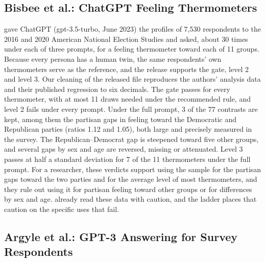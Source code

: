 \subsection{Bisbee et al.: ChatGPT Feeling Thermometers}

\citet{bisbee2024synthetic} gave ChatGPT (gpt-3.5-turbo, June 2023) the profiles of 7,530 respondents to the 2016 and 2020 American National Election Studies and asked, about 30 times under each of three prompts, for a feeling thermometer toward each of 11 groups. %
Because every persona has a human twin, the same respondents' own thermometers serve as the reference, and the release supports the gate, level 2 and level 3.
Our cleaning of the released file reproduces the authors' analysis data and their published regression to six decimals. %
The gate passes for every thermometer, with at most 11 draws needed under the recommended rule, and level 2 fails under every prompt. %
Under the full prompt, 3 of the 77 contrasts are kept, among them the partisan gaps in feeling toward the Democratic and Republican parties (ratios 1.12 and 1.05), both large and precisely measured in the survey. %
The Republican--Democrat gap is steepened toward five other groups, and several gaps by sex and age are reversed, missing or attenuated. %
Level 3 passes at half a standard deviation for 7 of the 11 thermometers under the full prompt. %
For a researcher, these verdicts support using the sample for the partisan gaps toward the two parties and for the average level of most thermometers, and they rule out using it for partisan feeling toward other groups or for differences by sex and age.
\citet{bisbee2024synthetic} already read these data with caution, and the ladder places that caution on the specific uses that fail.

\subsection{Argyle et al.: GPT-3 Answering for Survey Respondents}

